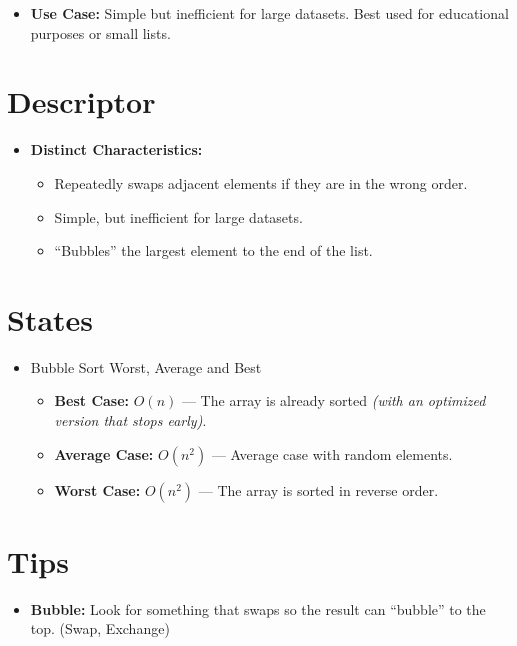\documentclass[
  letterpaper,
  DIV=11,
  numbers=noendperiod]{scrreprt}
\providecommand{\tightlist}{%
  \setlength{\itemsep}{0pt}\setlength{\parskip}{0pt}}
\begin{document}
\begin{itemize}
\tightlist
\item
  \textbf{Use Case:} Simple but inefficient for large datasets. Best
  used for educational purposes or small lists.
\end{itemize}

\section{Descriptor}

\begin{itemize}
\item
  \textbf{Distinct Characteristics:}

  \begin{itemize}
  \tightlist
  \item
    Repeatedly swaps adjacent elements if they are in the wrong order.
  \item
    Simple, but inefficient for large datasets.
  \item
    ``Bubbles'' the largest element to the end of the list.
  \end{itemize}
\end{itemize}

\section{States}

\begin{itemize}
\tightlist
\item
  Bubble Sort Worst, Average and Best

  \begin{itemize}
  \tightlist
  \item
    \textbf{Best Case:} \(O(n)\) --- The array is already sorted
    \emph{(with an optimized version that stops early)}.
  \item
    \textbf{Average Case:} \(O(n^2)\) --- Average case with random
    elements.
  \item
    \textbf{Worst Case:} \(O(n^2)\) --- The array is sorted in reverse
    order.
  \end{itemize}
\end{itemize}

\section{Tips}

\begin{itemize}
\tightlist
\item
  \textbf{Bubble:} Look for something that swaps so the result can
  ``bubble'' to the top. (Swap, Exchange)
\end{itemize}
\end{document}
